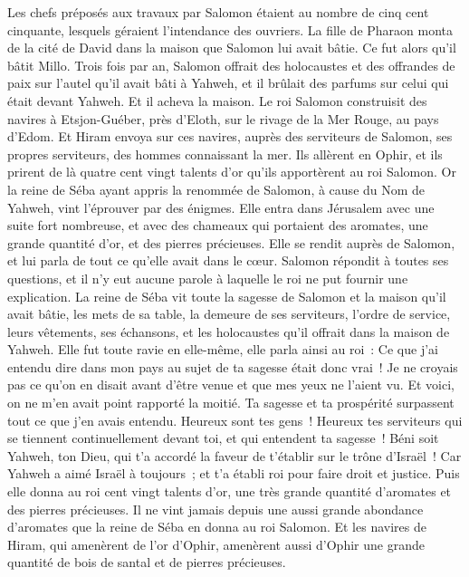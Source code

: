 \begin{multicols}{2}
Les chefs préposés aux travaux par Salomon étaient au nombre de cinq cent cinquante, lesquels géraient l'intendance des ouvriers.
La fille de Pharaon monta de la cité de David dans la maison que Salomon lui avait bâtie. Ce fut alors qu'il bâtit Millo.
Trois fois par an, Salomon offrait des holocaustes et des offrandes de paix sur l'autel qu'il avait bâti à Yahweh, et il brûlait des parfums sur celui qui était devant Yahweh. Et il acheva la maison.
Le roi Salomon construisit des navires à Etsjon-Guéber, près d'Eloth, sur le rivage de la Mer Rouge, au pays d'Edom.
Et Hiram envoya sur ces navires, auprès des serviteurs de Salomon, ses propres serviteurs, des hommes connaissant la mer.
Ils allèrent en Ophir, et ils prirent de là quatre cent vingt talents d'or qu'ils apportèrent au roi Salomon.
\VerseOne{}Or la reine de Séba ayant appris la renommée de Salomon, à cause du Nom de Yahweh, vint l'éprouver par des énigmes.
Elle entra dans Jérusalem avec une suite fort nombreuse, et avec des chameaux qui portaient des aromates, une grande quantité d'or, et des pierres précieuses. Elle se rendit auprès de Salomon, et lui parla de tout ce qu'elle avait dans le cœur.
Salomon répondit à toutes ses questions, et il n'y eut aucune parole à laquelle le roi ne put fournir une explication.
La reine de Séba vit toute la sagesse de Salomon et la maison qu'il avait bâtie,
les mets de sa table, la demeure de ses serviteurs, l'ordre de service, leurs vêtements, ses échansons, et les holocaustes qu'il offrait dans la maison de Yahweh.
Elle fut toute ravie en elle-même, elle parla ainsi au roi~: Ce que j'ai entendu dire dans mon pays au sujet de ta sagesse était donc vrai~!
Je ne croyais pas ce qu'on en disait avant d'être venue et que mes yeux ne l'aient vu. Et voici, on ne m'en avait point rapporté la moitié. Ta sagesse et ta prospérité surpassent tout ce que j'en avais entendu.
Heureux sont tes gens~! Heureux tes serviteurs qui se tiennent continuellement devant toi, et qui entendent ta sagesse~!
Béni soit Yahweh, ton Dieu, qui t'a accordé la faveur de t'établir sur le trône d'Israël~! Car Yahweh a aimé Israël à toujours~; et t'a établi roi pour faire droit et justice.
Puis elle donna au roi cent vingt talents d'or, une très grande quantité d'aromates et des pierres précieuses. Il ne vint jamais depuis une aussi grande abondance d'aromates que la reine de Séba en donna au roi Salomon.
Et les navires de Hiram, qui amenèrent de l'or d'Ophir, amenèrent aussi d'Ophir une grande quantité de bois de santal et de pierres précieuses.

\end{multicols}
